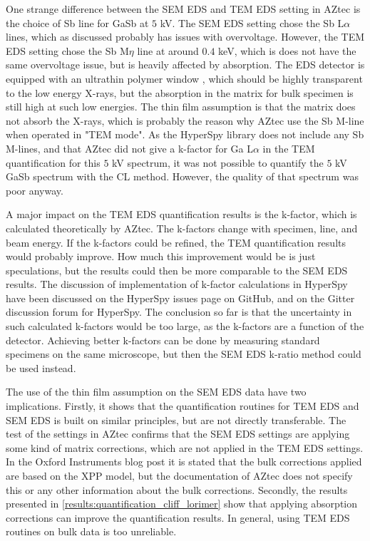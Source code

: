 One strange difference between the SEM EDS and TEM EDS setting in AZtec is the choice of Sb line for GaSb at $5$ kV.
The SEM EDS setting chose the Sb L$\alpha$ lines, which as discussed probably has issues with overvoltage.
However, the TEM EDS setting chose the Sb M$\eta$ line at around $0.4$ keV, which is does not have the same overvoltage issue, but is heavily affected by absorption.
The EDS detector is equipped with an ultrathin polymer window \cite{xmaxn_datasheet}, which should be highly transparent to the low energy X-rays, but the absorption in the matrix for bulk specimen is still high at such low energies.
The thin film assumption is that the matrix does not absorb the X-rays, which is probably the reason why AZtec use the Sb M-line when operated in "TEM mode".
As the HyperSpy library does not include any Sb M-lines, and that AZtec did not give a k-factor for Ga L$\alpha$ in the TEM quantification for this $5$ kV spectrum, it was not possible to quantify the $5$ kV GaSb spectrum with the CL method.
However, the quality of that spectrum was poor anyway.


A major impact on the TEM EDS quantification results is the k-factor, which is calculated theoretically by AZtec.
The k-factors change with specimen, line, and beam energy.
If the k-factors could be refined, the TEM quantification results would probably improve.
How much this improvement would be is just speculations, but the results could then be more comparable to the SEM EDS results.
The discussion of implementation of k-factor calculations in HyperSpy have been discussed on the HyperSpy issues page on GitHub, and on the Gitter discussion forum for HyperSpy.
The conclusion so far is that the uncertainty in such calculated k-factors would be too large, as the k-factors are a function of the detector.
Achieving better k-factors can be done by measuring standard specimens on the same microscope, but then the SEM EDS k-ratio method could be used instead.


The use of the thin film assumption on the SEM EDS data have two implications.
Firstly, it shows that the quantification routines for TEM EDS and SEM EDS is built on similar principles, but are not directly transferable.
The test of the settings in AZtec confirms that the SEM EDS settings are applying some kind of matrix corrections, which are not applied in the TEM EDS settings.
In the Oxford Instruments blog post\cite{oxford_blog_XPP} it is stated that the bulk corrections applied are based on the XPP model, but the documentation of AZtec does not specify this or any other information about the bulk corrections\cite{aztec_manual}.
Secondly, the results presented in \cref{results:quantification_cliff_lorimer} show that applying absorption corrections can improve the quantification results.
In general, using TEM EDS routines on bulk data is too unreliable.

